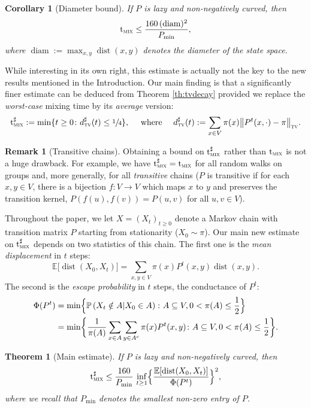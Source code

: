 \documentclass[JEP,XML,SOM,Unicode,NoEqCountersInSection,published]{cedram}
\newtheorem{theorem}{Theorem}
\newtheorem{corollary}{Corollary}
\theoremstyle{definition}
\newtheorem{remark}{Remark}
\newcommand{\EE}{{\mathbb{E}}}
\newcommand{\PP}{{\mathbb{P}}}
\newcommand{\dtv}{d_{\textup{\textsc{tv}}}}
\newcommand{\tv}{\textup{\textsc{tv}}}
\newcommand{\tmix}{\mathrm{t}_{\textup{\textsc{mix}}}}
\newcommand{\pmin}{P_{\mathrm{min}}}
\DeclareMathOperator{\diam}{diam}
\DeclareMathOperator{\dist}{dist}
\begin{document}
\begin{corollary}[Diameter bound]\label{co:diam}If $P$ is lazy and non-negatively curved, then
\begin{equation*}
\tmix \le \frac{160\,(\diam)^2}{\pmin},
\end{equation*}
where $\diam:=\max_{x,y}\dist(x,y)$ denotes the diameter of the state space.
\end{corollary}
While interesting in its own right, this estimate is actually not the key to the new results mentioned in the Introduction. Our main finding is that a significantly finer estimate can be deduced from Theorem \ref{th:tvdecay} provided we replace the \emph{worst-case} mixing time by its \emph{average} version:
\begin{equation*}
\tmix^{\sharp} := \min\{t \ge 0\colon \dtv^\sharp(t)\le \sfrac 14\},\quad\textrm{ where }\quad \dtv^\sharp(t):=\sum_{x\in V}\pi(x)\bigl\|P^t(x,\cdot)-\pi\bigr\|_{\tv}.
\end{equation*}
\begin{remark}[Transitive chains]Obtaining a bound on $\tmix^\sharp$ rather than $\tmix$ is not a huge drawback. For example, we have $\tmix^\sharp=\tmix$ for all random walks on groups and, more generally, for all \emph{transitive} chains ($P$ is transitive if for each $x,y \in V$, there is a bijection $f\colon V\to V$ which maps $x$ to $y$ and preserves the transition kernel, \ie $P(f(u),f(v))=P(u,v)$ for all $u,v \in V$).
\end{remark}
Throughout the paper, we let $X=(X_t)_{t\ge 0}$ denote a Markov chain with transition matrix $P$ starting from stationarity ($X_0\sim \pi$). Our main new estimate on $\tmix^\sharp$ depends on two statistics of this chain. The first one is the \emph{mean displacement} in $t$ steps: \begin{equation*}
\EE \bigl[\dist(X_0,X_t) \bigr] = \sum_{x,y\in V}\pi(x)P^t(x,y)\dist(x,y).
\end{equation*}
The second is the \emph{escape probability} in $t$ steps, \ie the conductance of $P^t$:
\begin{align*}
\Phi(P^t) & = \min\Bigl\{\PP\left(X_t\notin A|X_0\in A\right)\colon A\subseteq V,0<\pi(A)\le \frac 12 \Bigr\}\\
& = \min\biggl\{\frac{1}{\pi(A)}\sum_{x\in A}\sum_{y\in A^c}\pi(x)P^t(x,y)\colon A\subseteq V,0<\pi(A)\le \frac 12\biggr\}.
\end{align*}
\begin{theorem}[Main estimate]\label{th:main} If $P$ is lazy and non-negatively curved, then
\begin{equation}
\label{infimum}
\tmix^\sharp \le \frac{160}{\pmin}\,\inf_{t\ge 1} \Bigl\{\frac{\EE[\dist(X_0,X_t)]}{\Phi(P^t)} \Bigr\}^2,
\end{equation}
where we recall that $\pmin$ denotes the smallest non-zero entry of $P$.
\end{theorem}
\end{document}
